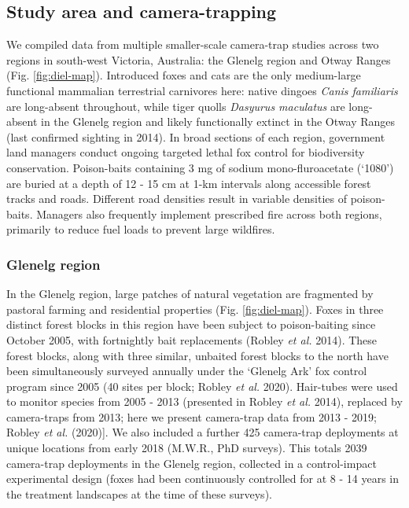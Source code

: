 \documentclass[]{elsarticle} %
\begin{document}
\hypertarget{study-area-and-camera-trapping}{%
\subsection{Study area and camera-trapping}\label{study-area-and-camera-trapping}}

We compiled data from multiple smaller-scale camera-trap studies across two regions in south-west Victoria, Australia: the Glenelg region and Otway Ranges (Fig. \ref{fig:diel-map}). Introduced foxes and cats are the only medium-large functional mammalian terrestrial carnivores here: native dingoes \emph{Canis familiaris} are long-absent throughout, while tiger quolls \emph{Dasyurus maculatus} are long-absent in the Glenelg region and likely functionally extinct in the Otway Ranges (last confirmed sighting in 2014). In broad sections of each region, government land managers conduct ongoing targeted lethal fox control for biodiversity conservation. Poison-baits containing 3 mg of sodium mono-fluroacetate (`1080') are buried at a depth of 12 - 15 cm at 1-km intervals along accessible forest tracks and roads. Different road densities result in variable densities of poison-baits. Managers also frequently implement prescribed fire across both regions, primarily to reduce fuel loads to prevent large wildfires.

\hypertarget{glenelg-region}{%
\subsubsection{Glenelg region}\label{glenelg-region}}

In the Glenelg region, large patches of natural vegetation are fragmented by pastoral farming and residential properties (Fig. \ref{fig:diel-map}). Foxes in three distinct forest blocks in this region have been subject to poison-baiting since October 2005, with fortnightly bait replacements (Robley \emph{et al.} 2014). These forest blocks, along with three similar, unbaited forest blocks to the north have been simultaneously surveyed annually under the `Glenelg Ark' fox control program since 2005 (40 sites per block; Robley \emph{et al.} 2020). Hair-tubes were used to monitor species from 2005 - 2013 (presented in Robley \emph{et al.} 2014), replaced by camera-traps from 2013; here we present camera-trap data from 2013 - 2019; Robley \emph{et al.} (2020){]}. We also included a further 425 camera-trap deployments at unique locations from early 2018 (M.W.R., PhD surveys). This totals 2039 camera-trap deployments in the Glenelg region, collected in a control-impact experimental design (foxes had been continuously controlled for at 8 - 14 years in the treatment landscapes at the time of these surveys).
\end{document}
